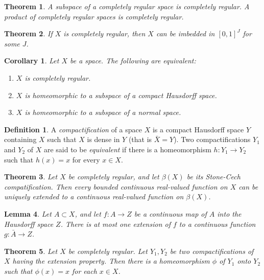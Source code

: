 \documentclass{article}
\newtheorem{theorem}{Theorem}[section]
\newtheorem{lemma}[theorem]{Lemma}
\newtheorem{corollary}{Corollary}[theorem]
\theoremstyle{remark}
\theoremstyle{definition}
\newtheorem{definition}{Definition}[section]
\begin{document}
\begin{theorem}
A subspace of a completely regular space is completely regular. A product of completely regular spaces is completely regular. 
\end{theorem}

\begin{theorem}
If $X$ is completely regular, then $X$ can be imbedded in $[0,1]^J$ for some $J$. 
\end{theorem}

\begin{corollary}
Let $X$ be a space. The following are equivalent: 
\begin{enumerate}
    \item $X$ is completely regular. 
    \item $X$ is homeomorphic to a subspace of a compact Hausdorff space. 
    \item $X$ is homeomorphic to a subspace of a normal space. 
\end{enumerate}
\end{corollary}

\begin{definition}
A \textit{compactification} of a space $X$ is a compact Hausdorff space $Y$ containing $X$ such that $X$ is dense in $Y$ (that is $\bar{X} = Y$). Two compactifications $Y_1$ and $Y_2$ of $X$ are said to be \textit{equivalent} if there is a homeomorphism $h: Y_1 \longrightarrow Y_2$ such that $h(x) = x$ for every $x \in X$. 
\end{definition}

\begin{theorem}
Let $X$ be completely regular, and let $\beta(X)$ be its Stone-Cech compatification. Then every bounded continuous real-valued function on $X$ can be uniquely extended to a continuous real-valued function on $\beta(X)$. 
\end{theorem}

\begin{lemma}
Let $A \subset X$, and let $f: A \longrightarrow Z$ be a continuous map of $A$ into the Hausdorff space $Z$. There is at most one extension of $f$ to a continuous function $g: \bar{A} \longrightarrow Z$. 
\end{lemma}

\begin{theorem}
Let $X$ be completely regular. Let $Y_1, Y_2$ be two compactifications of $X$ having the extension property. Then there is a homeomorphism $\phi$ of $Y_1$ onto $Y_2$ such that $\phi(x) = x$ for each $x \in X$. 
\end{theorem}
\end{document}
